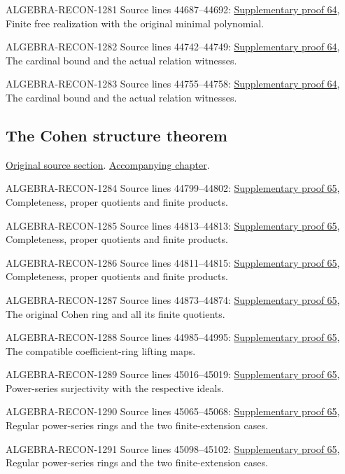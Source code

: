\begin{AlgebraSourceRoutes}
\item[ALGEBRA-RECON-1281] Source lines 44687--44692: \hyperlink{algebra_construct_flat_notes_20260929}{Supplementary proof 64}, Finite free realization with the original minimal polynomial.
\item[ALGEBRA-RECON-1282] Source lines 44742--44749: \hyperlink{algebra_construct_flat_notes_20260929}{Supplementary proof 64}, The cardinal bound and the actual relation witnesses.
\item[ALGEBRA-RECON-1283] Source lines 44755--44758: \hyperlink{algebra_construct_flat_notes_20260929}{Supplementary proof 64}, The cardinal bound and the actual relation witnesses.
\end{AlgebraSourceRoutes}

\subsection{The Cohen structure theorem}
\hypertarget{algebra-source-section-cohen-structure-theorem}{}
\noindent\href{https://github.com/stacks/stacks-project/blob/a04446e57ec1fbc252a871afcec7752fb2807b14/algebra.tex\#L44779}{Original source section}. \href{algebra.pdf\#nameddest=section-cohen-structure-theorem}{Accompanying chapter}.

\begin{AlgebraSourceRoutes}
\item[ALGEBRA-RECON-1284] Source lines 44799--44802: \hyperlink{algebra_cohen_notes_20260929}{Supplementary proof 65}, Completeness, proper quotients and finite products.
\item[ALGEBRA-RECON-1285] Source lines 44813--44813: \hyperlink{algebra_cohen_notes_20260929}{Supplementary proof 65}, Completeness, proper quotients and finite products.
\item[ALGEBRA-RECON-1286] Source lines 44811--44815: \hyperlink{algebra_cohen_notes_20260929}{Supplementary proof 65}, Completeness, proper quotients and finite products.
\item[ALGEBRA-RECON-1287] Source lines 44873--44874: \hyperlink{algebra_cohen_notes_20260929}{Supplementary proof 65}, The original Cohen ring and all its finite quotients.
\item[ALGEBRA-RECON-1288] Source lines 44985--44995: \hyperlink{algebra_cohen_notes_20260929}{Supplementary proof 65}, The compatible coefficient-ring lifting maps.
\item[ALGEBRA-RECON-1289] Source lines 45016--45019: \hyperlink{algebra_cohen_notes_20260929}{Supplementary proof 65}, Power-series surjectivity with the respective ideals.
\item[ALGEBRA-RECON-1290] Source lines 45065--45068: \hyperlink{algebra_cohen_notes_20260929}{Supplementary proof 65}, Regular power-series rings and the two finite-extension cases.
\item[ALGEBRA-RECON-1291] Source lines 45098--45102: \hyperlink{algebra_cohen_notes_20260929}{Supplementary proof 65}, Regular power-series rings and the two finite-extension cases.
\end{AlgebraSourceRoutes}

